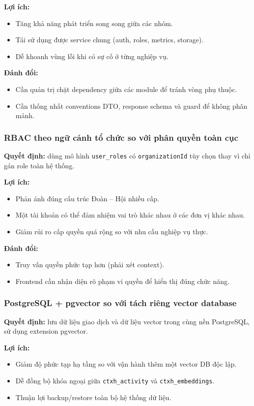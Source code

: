 \textbf{Lợi ích:}
\begin{itemize}
	\item Tăng khả năng phát triển song song giữa các nhóm.
	\item Tái sử dụng được service chung (auth, roles, metrics, storage).
	\item Dễ khoanh vùng lỗi khi có sự cố ở từng nghiệp vụ.
\end{itemize}

\textbf{Đánh đổi:}
\begin{itemize}
	\item Cần quản trị chặt dependency giữa các module để tránh vòng phụ thuộc.
	\item Cần thống nhất conventions DTO, response schema và guard để không phân mảnh.
\end{itemize}

\subsubsection{RBAC theo ngữ cảnh tổ chức so với phân quyền toàn cục}
\textbf{Quyết định:} dùng mô hình \texttt{user\_roles} có \texttt{organizationId} tùy chọn thay vì chỉ gán role toàn hệ thống.

\textbf{Lợi ích:}
\begin{itemize}
	\item Phản ánh đúng cấu trúc Đoàn -- Hội nhiều cấp.
	\item Một tài khoản có thể đảm nhiệm vai trò khác nhau ở các đơn vị khác nhau.
	\item Giảm rủi ro cấp quyền quá rộng so với nhu cầu nghiệp vụ thực.
\end{itemize}

\textbf{Đánh đổi:}
\begin{itemize}
	\item Truy vấn quyền phức tạp hơn (phải xét context).
	\item Frontend cần nhận diện rõ phạm vi quyền để hiển thị đúng chức năng.
\end{itemize}

\subsubsection{PostgreSQL + pgvector so với tách riêng vector database}
\textbf{Quyết định:} lưu dữ liệu giao dịch và dữ liệu vector trong cùng nền PostgreSQL, sử dụng extension pgvector.

\textbf{Lợi ích:}
\begin{itemize}
	\item Giảm độ phức tạp hạ tầng so với vận hành thêm một vector DB độc lập.
	\item Dễ đồng bộ khóa ngoại giữa \texttt{ctxh\_activity} và \texttt{ctxh\_embeddings}.
	\item Thuận lợi backup/restore toàn bộ hệ thống dữ liệu.
\end{itemize}

